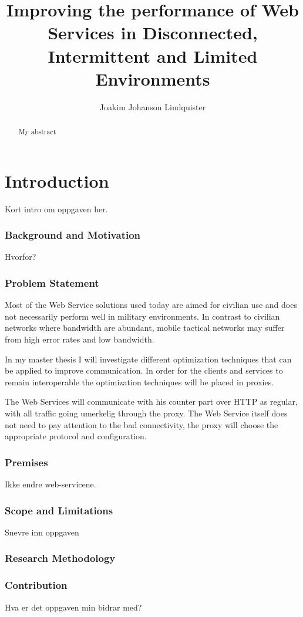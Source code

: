 \documentclass[USenglish]{article}
\title{Improving the performance of Web Services in Disconnected, Intermittent and Limited Environments}
\author{Joakim Johanson Lindquister}
\begin{document}
\ififorside{}

\begin{abstract}
    My abstract
\end{abstract}

\part{Introduction}
Kort intro om oppgaven her.
\section{Background and Motivation}
Hvorfor?

\section{Problem Statement}
Most of the Web Service solutions used today are aimed for civilian use and does
not necessarily perform well in military environments. In contrast to civilian
networks where bandwidth are abundant, mobile tactical networks may suffer
from high error rates and low bandwidth.

In my master thesis I will investigate different optimization techniques that
can be applied to improve communication. In order for the clients and services
 to remain interoperable the optimization techniques will be placed in proxies.

The Web Services will communicate with his counter part over HTTP as regular,
with all traffic going umerkelig through the proxy. The Web Service itself does
not need to pay attention to the bad connectivity, the proxy will choose the
appropriate protocol and configuration.

\section{Premises}
Ikke endre web-servicene.

\section{Scope and Limitations}
Snevre inn oppgaven

\section{Research Methodology}

\section{Contribution}
Hva er det oppgaven min bidrar med?
\end{document}
